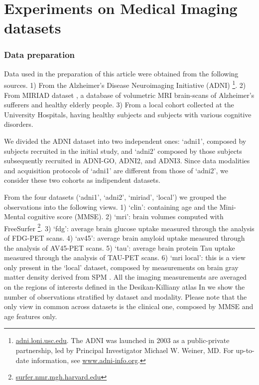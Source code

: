 \section{Experiments on Medical Imaging datasets}
\label{ssec:real}

\newpage

% 
% 



% 

\subsubsection{Data preparation}
Data used in the preparation of this article were obtained from the following sources.
1) From the Alzheimer's Disease Neuroimaging Initiative (ADNI)
\footnote{
\href{http://adni.loni.usc.edu}{adni.loni.usc.edu}. The ADNI was launched in 2003 as a public-private partnership, led by Principal Investigator Michael W. Weiner, MD. For up-to-date information, see \href{www.adni-info.org}{www.adni-info.org}.
}.
2) From MIRIAD dataset \cite{Miriad}, a database of volumetric MRI brain-scans of Alzheimer's sufferers and healthy elderly people.
3) From a local cohort collected at the University Hospitals, having healthy subjects and subjects with various cognitive disorders.

We divided the ADNI dataset into two independent ones:
`adni1', composed by subjects recruited in the initial study,
and `adni2' composed by those subjects subsequently recruited in ADNI-GO, ADNI2, and ADNI3.
Since data modalities and acquisition protocols of `adni1' are different from those of `adni2', we consider these two cohorts as indipendent datasets.

From the four datasets (`adni1', `adni2', `miriad', `local') we grouped the observations into the following views.
1) `clin': containing age and the Mini-Mental cognitive score (MMSE).
2) `mri': brain volumes computed with FreeSurfer \footnote{
\href{https://surfer.nmr.mgh.harvard.edu/}{surfer.nmr.mgh.harvard.edu}
}.
3) `fdg': average brain glucose uptake measured through the analysis of FDG-PET scans.
4) `av45': average brain amyloid uptake measured through the analysis of AV45-PET scans.
5) `tau': average brain protein Tau uptake measured through the analysis of TAU-PET scans.
6) `mri local': this is a view only present in the `local' dataset, composed by measurements on brain gray matter density derived from SPM \cite{Ashburner2000}.
All the imaging measurements are averaged on the regions of interests defined in the Desikan-Killiany atlas \cite{Desikan2006}
In  we show the number of observations stratified by dataset and modality.
Please note that the only view in common across datasets is the clinical one, composed by MMSE and age features only.

